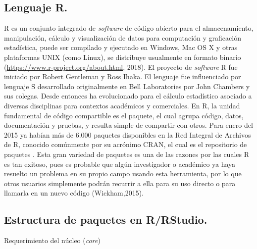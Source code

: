 \subsection{Lenguaje R.}

R es un conjunto  integrado de \textit{software} de código abierto para el almacenamiento, manipulación, cálculo y visualización de datos para computación y graficación estadística, puede ser compilado y ejecutado en Windows, Mac OS X y otras  plataformas UNIX (como Linux), se distribuye usualmente en formato binario (\url{https://www.r-project.org/about.html}, 2018). El proyecto de \emph{software} R fue iniciado por Robert Gentleman y Ross Ihaka. El lenguaje fue influenciado por  lenguaje S desarrollado originalmente en Bell Laboratories por John Chambers y sus colegas. Desde entonces ha evolucionado  para el cálculo estadístico asociado a diversas disciplinas para contextos académicos y comerciales. En R, la unidad fundamental de código compartible es el paquete, el cual agrupa código, datos, documentación y pruebas, y resulta simple de compartir con otros. Para enero del 2015 ya habían más de 6.000 paquetes disponibles en la Red Integral de Archivos de R, conocido comúnmente por su acrónimo CRAN, el cual es el repositorio de paquetes . Esta gran variedad de paquetes es una de las razones por las cuales R es tan exitoso, pues es probable que algún investigador o académico ya haya resuelto un problema en su propio campo usando esta herramienta, por lo que otros usuarios simplemente podrán recurrir a ella para su uso directo o para llamarla en un nuevo código (Wickham,2015). \\

\subsection{Estructura de paquetes en R/RStudio.}

Requerimiento del núcleo (\textit{core})

